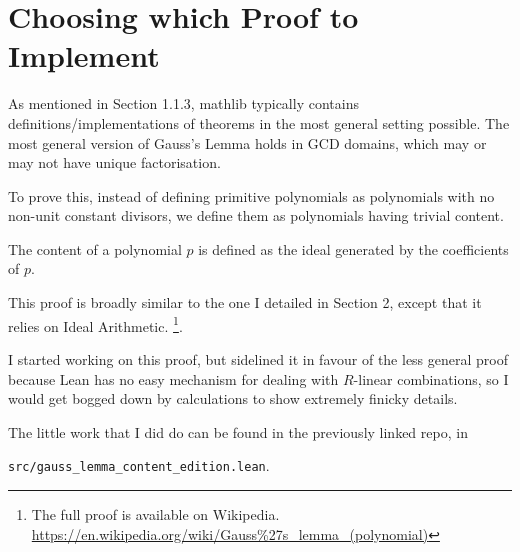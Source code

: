 \documentclass[pagesize=a4]{scrreprt}
\begin{document}
\section{Choosing which Proof to Implement}

As mentioned in Section 1.1.3, mathlib typically contains definitions/implementations of theorems in the most general setting possible. The most general version of Gauss's Lemma holds in GCD domains, which may or may not have unique factorisation. 

To prove this, instead of defining primitive polynomials as polynomials with no non-unit constant divisors, we define them as polynomials having trivial content. 

The content of a polynomial $p$ is defined as the ideal generated by the coefficients of $p$. 

This proof is broadly similar to the one I detailed in Section 2, except that it relies on Ideal Arithmetic. \footnote{The full proof is available on Wikipedia. \url{https://en.wikipedia.org/wiki/Gauss\%27s\_lemma\_(polynomial)}}. 

I started working on this proof, but sidelined it in favour of the less general proof because Lean has no easy mechanism for dealing with $R$-linear combinations, so I would get bogged down by calculations to show extremely finicky details. 

The little work that I did do can be found in the previously linked repo, in 

\texttt{src/gauss\_lemma\_content\_edition.lean}. 
\end{document}
